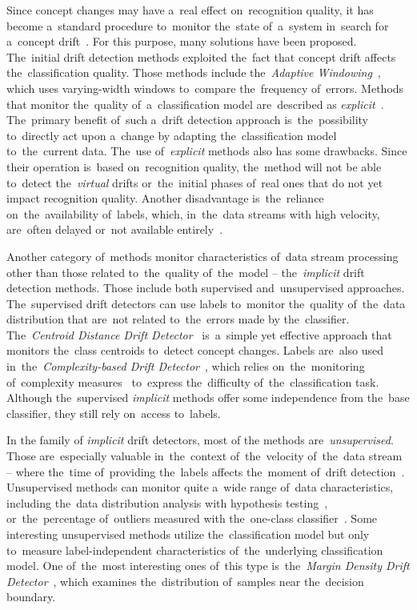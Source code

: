Since concept changes may have a~real effect on~recognition quality, it has become a~standard procedure to~monitor the~state of~a~system in~search for a~concept drift~\cite{sethi2015don}. For this purpose, many solutions have been proposed. The~initial drift detection methods exploited the~fact that concept drift affects the~classification quality. Those methods include the~\textit{Adaptive Windowing}~\cite{bifet2007learning}, which uses varying-width windows to~compare the~frequency of~errors. Methods that monitor the~quality of~a~classification model are~described as \textit{explicit}~\cite{gozuaccik2021concept}. The~primary benefit of~such a~drift detection approach is~the~possibility to~directly act upon a~change by adapting the~classification model to~the~current data. The~use of~\textit{explicit} methods also has some drawbacks. Since their operation is~based on~recognition quality, the~method will not be able to~detect the~\textit{virtual} drifts or~the~initial phases of~real ones that do not yet impact recognition quality. Another disadvantage is~the~reliance on~the~availability of~labels, which, in~the~data streams with high velocity, are~often delayed or~not available entirely~\cite{grzenda2020delayed}.

Another category of~methods monitor characteristics of~data stream processing other than those related to~the~quality of~the~model -- the~\textit{implicit} drift detection methods. Those include both supervised and~unsupervised approaches. The~supervised drift detectors can use labels to~monitor the~quality of~the~data distribution that are~not related to~the~errors made by the~classifier. The~\textit{Centroid Distance Drift Detector}~\cite{klikowski2022concept} is~a~simple yet effective approach that monitors the~class centroids to~detect concept changes. Labels are~also used in~the~\textit{Complexity-based Drift Detector}~\cite{komorniczak2023complexity}, which relies on~the~monitoring of~complexity measures~\cite{lorena2019complex} to~express the~difficulty of~the~classification task. Although the~supervised \textit{implicit} methods offer some independence from the~base classifier, they still rely on~access to~labels.

In the family of \textit{implicit} drift detectors, most of the methods are~\textit{unsupervised}. Those are~especially valuable in~the~context of~the~velocity of~the~data stream -- where the~time of~providing the~labels affects the~moment of~drift detection~\cite{komorniczak2024structuring}. Unsupervised methods can monitor quite a~wide range of~data characteristics, including the~data distribution analysis with hypothesis testing~\cite{sobolewski2013comparable}, or~the~percentage of~outliers measured with the~one-class classifier~\cite{gozuaccik2021concept}. Some interesting unsupervised methods utilize the~classification model but only to~measure label-independent characteristics of~the~underlying classification model. One of~the~most interesting ones of~this type is~the~\textit{Margin Density Drift Detector}~\cite{sethi2015don}, which examines the~distribution of~samples near the~decision boundary.  


